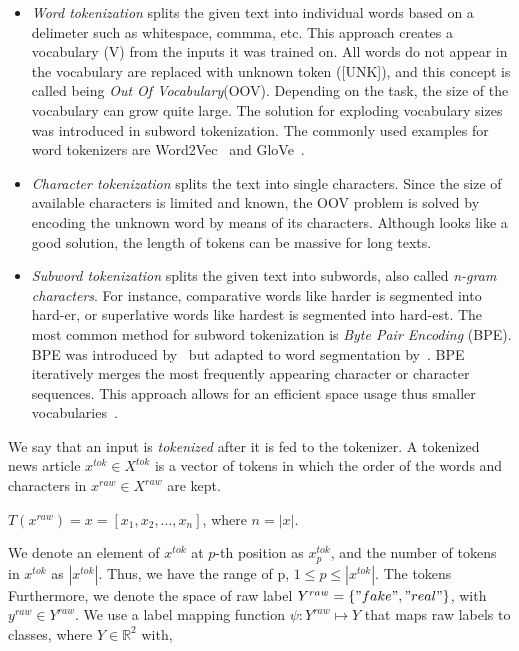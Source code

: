 \begin{itemize}
    \item \emph{Word tokenization} splits the given text into individual words based on a delimeter such as whitespace, commma, etc. This approach creates a vocabulary (V) from the inputs it was trained on. All words do not appear in the vocabulary are replaced with unknown token ([UNK]), and this concept is called being \emph{Out Of Vocabulary}(OOV). Depending on the task, the size of the vocabulary can grow quite large. The solution for exploding vocabulary sizes was introduced in subword tokenization. The commonly used examples for word tokenizers are Word2Vec~\parencite{Word2Vec_Mikolov} and GloVe~\parencite{GloVe_Pennington}.
    \item \emph{Character tokenization} splits the text into single characters. Since the size of available characters is limited and known, the OOV problem is solved by encoding the unknown word by means of its characters. Although looks like a good solution, the length of tokens can be massive for long texts.
    \item \emph{Subword tokenization} splits the given text into subwords, also called \emph{n-gram characters}. For instance, comparative words like harder is segmented into hard-er, or superlative words like hardest is segmented into hard-est. The most common method for subword tokenization is \emph{Byte Pair Encoding} (BPE). BPE was introduced by~\cite{ANewAlgorithmForDataCompression_Gage} but adapted to word segmentation by~\cite{NeuralMachineTranslationOfRareWords_Sennrich}. BPE iteratively merges the most frequently appearing character or character sequences. This approach allows for an efficient space usage thus smaller vocabularies~\parencite{NeuralMachineTranslationOfRareWords_Sennrich}.
\end{itemize}
We say that an input is \emph{tokenized} after it is fed to the tokenizer. A tokenized news article $x^{tok} \in X^{tok}$ is a vector of tokens in which the order of the words and characters in $x^{raw} \in X^{raw}$ are kept.
\begin{center}
    $T(x^{raw}) = x = [x_1, x_2, \dots, x_n]$, where $n = |x|$.
\end{center}
We denote an element of $x^{tok}$ at $p$-th position as $x_p^{tok}$, and the number of tokens in $x^{tok}$ as $|x^{tok}|$. Thus, we have the range of p, $1 \leq p \leq |x^{tok}|$. The tokens
Furthermore, we denote the space of raw label $Y^{raw} = \{"fake", "real"\}$, with
$y^{raw} \in Y^{raw}$. We use a label mapping function $\psi: Y^{raw} \mapsto Y$ that maps raw labels to classes, where $Y \in \mathbb{R}^2$ with,
